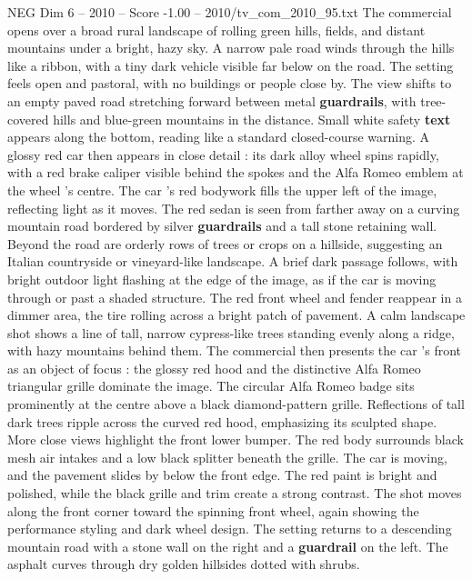\begin{textsample}{NEG Dim 6 – 2010 – Score -1.00 – 2010/tv\_com\_2010\_95.txt}  \label{ex:f6_neg_019}
The commercial opens over a broad rural landscape of rolling green hills, fields, and distant mountains under a bright, hazy sky.
A narrow pale road winds through the hills like a ribbon, with a tiny dark vehicle visible far below on the road.
The setting feels open and pastoral, with no buildings or people close by.
The view shifts to an empty paved road stretching forward between metal \textbf{guardrails}, with tree-covered hills and blue-green mountains in the distance.
Small white safety \textbf{text} appears along the bottom, reading like a standard closed-course warning.
A glossy red car then appears in close detail : its dark alloy wheel spins rapidly, with a red brake caliper visible behind the spokes and the Alfa Romeo emblem at the wheel ’s centre.
The car ’s red bodywork fills the upper left of the image, reflecting light as it moves.
The red sedan is seen from farther away on a curving mountain road bordered by silver \textbf{guardrails} and a tall stone retaining wall.
Beyond the road are orderly rows of trees or crops on a hillside, suggesting an Italian countryside or vineyard-like landscape.
A brief dark passage follows, with bright outdoor light flashing at the edge of the image, as if the car is moving through or past a shaded structure.
The red front wheel and fender reappear in a dimmer area, the tire rolling across a bright patch of pavement.
A calm landscape shot shows a line of tall, narrow cypress-like trees standing evenly along a ridge, with hazy mountains behind them.
The commercial then presents the car ’s front as an object of focus : the glossy red hood and the distinctive Alfa Romeo triangular grille dominate the image.
The circular Alfa Romeo badge sits prominently at the centre above a black diamond-pattern grille.
Reflections of tall dark trees ripple across the curved red hood, emphasizing its sculpted shape.
More close views highlight the front lower bumper.
The red body surrounds black mesh air intakes and a low black splitter beneath the grille.
The car is moving, and the pavement slides by below the front edge.
The red paint is bright and polished, while the black grille and trim create a strong contrast.
The shot moves along the front corner toward the spinning front wheel, again showing the performance styling and dark wheel design.
The setting returns to a descending mountain road with a stone wall on the right and a \textbf{guardrail} on the left.
The asphalt curves through dry golden hillsides dotted with shrubs.

\end{textsample}
